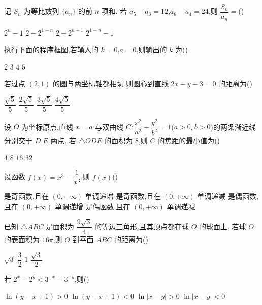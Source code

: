 \begin{problem}
记 \(S_n\) 为等比数列 \(\{a_n\}\) 的前 \(n\) 项和. 若 \(a_5-a_3=12\),\(a_6-a_4=24\),则 \(\dfrac{S_n}{a_n}=\)(\quad)

\choices
    {\(2^n-1\)}
    {\(2-2^{1-n}\)}
    {\(2-2^{n-1}\)}
    {\(2^{1-n}-1\)}
\end{problem}

\begin{problem}
执行下面的程序框图,若输入的 \(k=0\),\(a=0\),则输出的 \(k\) 为(\quad)


\choices
    {\(2\)}
    {\(3\)}
    {\(4\)}
    {\(5\)}
\end{problem}

\begin{problem}
若过点 \((2,1)\) 的圆与两坐标轴都相切,则圆心到直线 \(2x-y-3=0\) 的距离为(\quad)

\choices
    {\(\dfrac{\sqrt5}{5}\)}
    {\(\dfrac{2\sqrt5}{5}\)}
    {\(\dfrac{3\sqrt5}{5}\)}
    {\(\dfrac{4\sqrt5}{5}\)}
\end{problem}

\begin{problem}
设 \(O\) 为坐标原点,直线 \(x=a\) 与双曲线 \(C:\dfrac{x^2}{a^2}-\dfrac{y^2}{b^2}=1\)(\(a>0\),\(\ b>0\))的两条渐近线分别交于 \(D\),\(E\) 两点. 若 \(\triangle ODE\) 的面积为 \(8\),则 \(C\) 的焦距的最小值为(\quad)

\choices
    {\(4\)}
    {\(8\)}
    {\(16\)}
    {\(32\)}
\end{problem}

\begin{problem}
设函数 \(f(x)=x^3-\dfrac{1}{x^3}\),则 \(f(x)\)(\quad)

\choices
    {是奇函数,且在 \((0,+\infty)\) 单调递增}
    {是奇函数,且在 \((0,+\infty)\) 单调递减}
    {是偶函数,且在 \((0,+\infty)\) 单调递增}
    {是偶函数,且在 \((0,+\infty)\) 单调递减}
\end{problem}

\begin{problem}
已知 \(\triangle ABC\) 是面积为 \(\dfrac{9\sqrt3}{4}\) 的等边三角形,且其顶点都在球 \(O\) 的球面上. 若球 \(O\) 的表面积为 \(16\pi\),则 \(O\) 到平面 \(ABC\) 的距离为(\quad)

\choices
    {\(\sqrt3\)}
    {\(\dfrac{3}{2}\)}
    {\(1\)}
    {\(\dfrac{\sqrt3}{2}\)}
\end{problem}

\begin{problem}
若 \(2^x-2^y<3^{-x}-3^{-y}\),则(\quad)

\choices
    {\(\ln(y-x+1)>0\)}
    {\(\ln(y-x+1)<0\)}
    {\(\ln\lvert x-y\rvert>0\)}
    {\(\ln\lvert x-y\rvert<0\)}
\end{problem}

